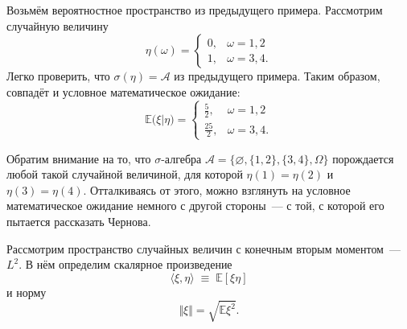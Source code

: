     \begin{exmp}
        Возьмём вероятностное пространство из предыдущего примера.
        Рассмотрим случайную величину 
        \begin{equation*}
            \eta(\omega) = \begin{cases} 
                0, & \omega = 1, 2 \\
                1, & \omega = 3, 4. 
            \end{cases}
        \end{equation*}
        Легко проверить, что $\sigma(\eta) = \mathcal{A}$ из предыдущего примера. 
        Таким образом, совпадёт и условное математическое ожидание:
        \begin{equation*}
            \mathbb{E}\bigl( \xi | \eta \bigr) = \begin{cases}
                \frac{5}{2}, & \omega = 1, 2\\
                \frac{25}{2}, & \omega = 3, 4.
            \end{cases}
        \end{equation*}
    \end{exmp}        

    Обратим внимание на то, что $\sigma$-алгебра $\mathcal{A} = \bigl\{ \varnothing, \{1, 2\}, \{3, 4\}, \Omega \bigr\}$ порождается любой такой случайной величиной, для которой $\eta(1) = \eta(2)$ и $\eta(3) = \eta(4)$.
    Отталкиваясь от этого, можно взглянуть на условное математическое ожидание немного с другой стороны~--- с той, с которой его пытается рассказать Чернова.

    Рассмотрим пространство случайных величин с конечным вторым моментом~--- $L^2$. 
    В нём определим скалярное произведение 
    \begin{equation*}
        \langle \xi, \eta \rangle \; \equiv \; \mathbb{E} \left[ \xi \eta \right]
    \end{equation*}
    и норму
    \begin{equation*}
        \Vert \xi \Vert = \sqrt{\mathbb{E} \xi^2 }.
    \end{equation*}

